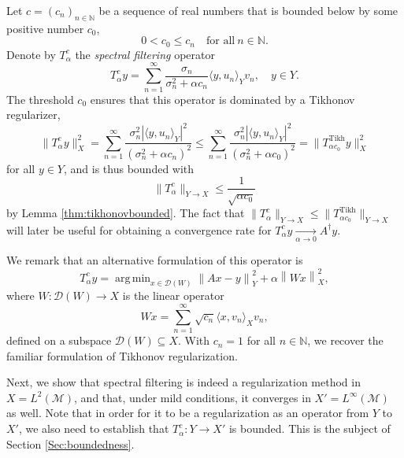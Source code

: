 \documentclass{article}
\theoremstyle{definition}
\newcommand{\N}{\mathbb{N}}
\newcommand{\smallnorm}[1]{\lVert#1\rVert}
\newcommand{\norm}[1]{\left\lVert#1\right\rVert}
\newcommand{\abs}[1]{\left\lvert#1\right\rvert}
\newcommand{\domainsymb}{\mathcal{D}}
\newcommand{\domain}[1]{\domainsymb({#1})}
\newcommand{\pseudoinv}[1]{{#1}^\dagger}
\DeclareMathOperator*{\argmin}{arg\,min}
\begin{document}
Let \(c=(c_n)_{n\in\N}\) be a sequence of real numbers
that is bounded below by some positive number \(c_0\),
\begin{equation*}
    0 < c_0 \leq c_n\quad\text{for all}\ n\in\N.
\end{equation*}
Denote by \(T^c_\alpha\) the \emph{spectral filtering} operator
\begin{equation}
\label{eq:spectralfilterdef}
    T^c_\alpha y = \sum_{n=1}^\infty
    \frac{\sigma_n}{\sigma_n^2 + \alpha c_n}
    \langle y,u_n \rangle_Y
    v_n,\quad y\in Y.
\end{equation}
The threshold \(c_0\) ensures that this operator is dominated by a Tikhonov regularizer,
\begin{equation*}
    \smallnorm{T^c_\alpha y}_X^2
    =
    \sum_{n=1}^\infty
    \frac{\sigma_n^2\abs{\langle y,u_n \rangle_Y}^2}{\left(\sigma_n^2 + \alpha c_n\right)^2}
    \leq
    \sum_{n=1}^\infty
    \frac{\sigma_n^2\abs{\langle y,u_n \rangle_Y}^2}{\left(\sigma_n^2 + \alpha c_0\right)^2}
    =
    \smallnorm{T^{\mathrm{Tikh}}_{\alpha c_0} y}_X^2
\end{equation*}
for all \(y\in Y\),
and is thus bounded with
\begin{equation}
\label{eq:spectralbounded}
    \smallnorm{T^c_\alpha}_{Y\to X}
    \leq
    \frac{1}{\sqrt{\alpha c_0}}
\end{equation}
by Lemma \ref{thm:tikhonovbounded}.
The fact that \(\smallnorm{T^c_\alpha}_{Y\to X}\leq \smallnorm{T^\mathrm{Tikh}_{\alpha c_0}}_{Y\to X}\) will later be useful for obtaining a convergence rate for \(T^c_\alpha y\xrightarrow[\alpha\to 0]{}\pseudoinv{A}y\).

We remark that an alternative formulation of this operator is
\begin{equation*}
    T^c_\alpha y =
    \argmin_{x\in \domain{W}}
    \norm{Ax-y}_Y^2
    +
    \alpha
    \norm{Wx}_X^2,
\end{equation*}
where \(W\colon \domain{W}\to X\) is the linear operator
\begin{equation*}
    Wx = \sum_{n=1}^\infty \sqrt{c_n} \langle x, v_n\rangle_X v_n,
\end{equation*}
defined on a subspace \(\domain{W}\subseteq X\).
With \(c_n=1\) for all \(n\in\N\), we recover the familiar formulation of Tikhonov regularization.

Next, we show that spectral filtering is indeed a regularization method in \(X=L^2(\mathcal{M})\), 
and that, under mild conditions, it converges in \(X'=L^\infty(\mathcal{M})\) as well. Note that in order for it to be a regularization as an operator from $Y$ to $X'$, we also need to establish that $T_\alpha^c:Y \to X'$ is bounded. This is the subject of Section \ref{Sec:boundedness}.
\end{document}
